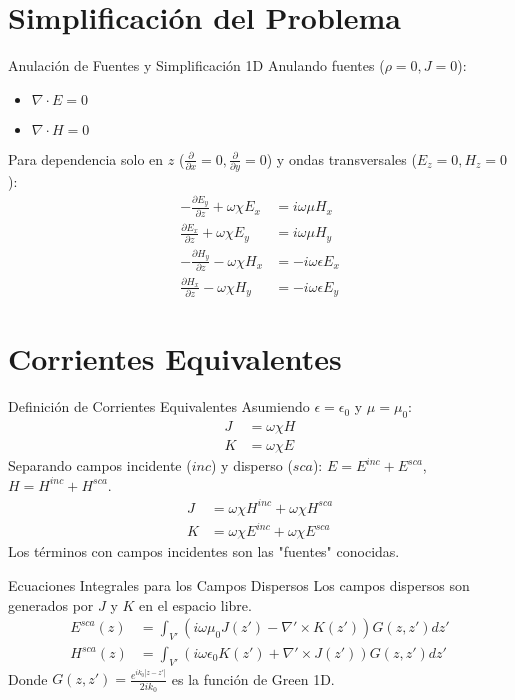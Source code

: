 \documentclass{beamer}
\begin{document}
\section{Simplificación del Problema}
\begin{frame}{Anulación de Fuentes y Simplificación 1D}
    Anulando fuentes ($\rho = 0, J = 0$):
    \begin{itemize}
        \item $\nabla \cdot E = 0$
        \item $\nabla \cdot H = 0$
    \end{itemize}
    Para dependencia solo en $z$ ($\frac{\partial}{\partial x} = 0, \frac{\partial}{\partial y} = 0$) y ondas transversales ($E_z=0, H_z=0$):
    \begin{align*}
        -\frac{\partial E_y}{\partial z} + \omega\chi E_x &= i\omega\mu H_x \\
        \frac{\partial E_x}{\partial z} + \omega\chi E_y &= i\omega\mu H_y \\
        -\frac{\partial H_y}{\partial z} - \omega\chi H_x &= -i\omega\epsilon E_x \\
        \frac{\partial H_x}{\partial z} - \omega\chi H_y &= -i\omega\epsilon E_y
    \end{align*}
\end{frame}

\section{Corrientes Equivalentes}
\begin{frame}{Definición de Corrientes Equivalentes}
    Asumiendo $\epsilon = \epsilon_0$ y $\mu = \mu_0$:
    \begin{align*}
        J &= \omega\chi H \\
        K &= \omega\chi E
    \end{align*}
    Separando campos incidente ($inc$) y disperso ($sca$): $E = E^{inc} + E^{sca}$, $H = H^{inc} + H^{sca}$.
    \begin{align*}
        J &= \omega\chi H^{inc} + \omega\chi H^{sca} \\
        K &= \omega\chi E^{inc} + \omega\chi E^{sca}
    \end{align*}
    Los términos con campos incidentes son las "fuentes" conocidas.
\end{frame}

\begin{frame}{Ecuaciones Integrales para los Campos Dispersos}
    Los campos dispersos son generados por $J$ y $K$ en el espacio libre.
    \begin{align*}
        E^{sca}(z) &= \int_{V'} \left( i\omega\mu_0 J(z') - \nabla' \times K(z') \right) G(z, z') dz' \\
        H^{sca}(z) &= \int_{V'} \left( i\omega\epsilon_0 K(z') + \nabla' \times J(z') \right) G(z, z') dz'
    \end{align*}
    Donde $G(z, z') = \frac{e^{ik_0|z-z'|}}{2ik_0}$ es la función de Green 1D.
\end{frame}
\end{document}
